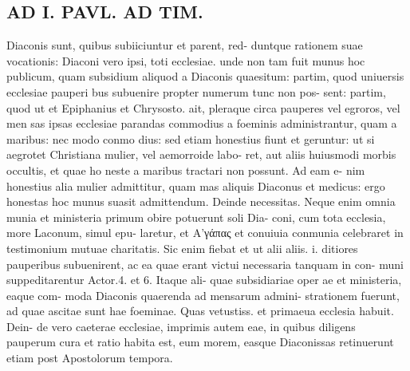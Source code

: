 \documentclass{article}
\begin{document}
\begin{pages}
\section*{AD I. PAVL. AD TIM. }
\marginpar{[ p.272 ]}Diaconis sunt, quibus subiiciuntur et parent, red- duntque rationem suae vocationis: Diaconi vero ipsi, toti ecclesiae. unde non tam fuit munus hoc publicum, quam subsidium aliquod a Diaconis quaesitum: partim, quod uniuersis ecclesiae pauperi bus subuenire propter numerum tunc non pos- sent: partim, quod ut et Epiphanius et Chrysosto. ait, pleraque circa pauperes vel egroros, vel men sas ipsas ecclesiae parandas commodius a foeminis administrantur, quam a maribus: nec modo conmo dius: sed etiam honestius fiunt et geruntur: ut si aegrotet Christiana mulier, vel aemorroide labo- ret, aut aliis huiusmodi morbis occultis, et quae ho neste a maribus tractari non possunt. Ad eam e- nim honestius alia mulier admittitur, quam mas aliquis Diaconus et medicus: ergo honestas hoc munus suasit admittendum. Deinde necessitas. Neque enim omnia munia et ministeria primum obire potuerunt soli Dia- coni, cum tota ecclesia, more Laconum, simul epu- laretur, et Α’γάπας et conuiuia conmunia celebraret in testimonium mutuae charitatis. Sic enim fiebat et ut alii aliis. i. ditiores pauperibus subuenirent, ac ea quae erant victui necessaria tanquam in con- muni suppeditarentur Actor.4. et 6. Itaque ali- quae subsidiariae oper ae et ministeria, eaque com- moda Diaconis quaerenda ad mensarum admini- strationem fuerunt, ad quae ascitae sunt hae foeminae. Quas vetustiss. et primaeua ecclesia habuit. Dein- de vero caeterae ecclesiae, imprimis autem eae, in quibus diligens pauperum cura et ratio habita est, eum morem, easque Diaconissas retinuerunt etiam post Apostolorum tempora. 

\end{pages}
\end{document}
